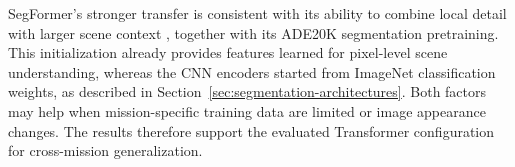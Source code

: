 SegFormer's stronger transfer is consistent with its ability to combine local detail with larger scene context \cite{xie2021segformer}, together with its ADE20K segmentation pretraining. This initialization already provides features learned for pixel-level scene understanding, whereas the CNN encoders started from ImageNet classification weights, as described in Section~\ref{sec:segmentation-architectures}. Both factors may help when mission-specific training data are limited or image appearance changes. The results therefore support the evaluated Transformer configuration for cross-mission generalization.

